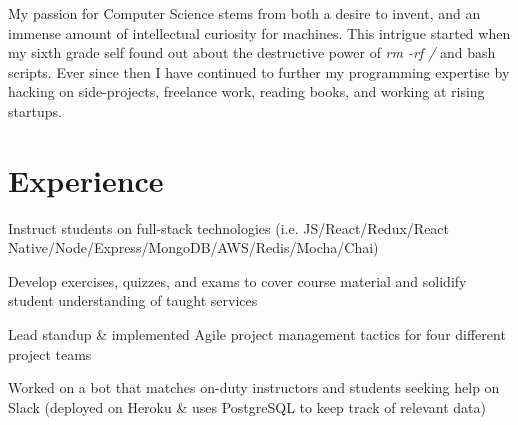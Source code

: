 \documentclass[letterpaper]{deedy-resume} %
\begin{document}
\begin{minipage}[t]{0.66\textwidth} %


  My passion for Computer Science stems from both a desire to invent,
  and an immense amount of intellectual curiosity for machines. This
  intrigue started when my sixth grade self found
  out about the destructive power of {\it rm -rf /} and bash scripts.
  Ever since then I have continued to further my programming
  expertise by hacking on side-projects, freelance work,
  reading books, and working at rising startups.
  


  \section{Experience}



  \begin{tightitemize}
  \item Instruct students on full-stack technologies (i.e. JS/React/Redux/React Native/Node/Express/MongoDB/AWS/Redis/Mocha/Chai)
  \item Develop exercises, quizzes, and exams to cover course material and solidify student understanding of taught services
  \item Lead standup \& implemented Agile project management tactics for four different project teams
  \item Worked on a bot that matches on-duty instructors and students seeking help on Slack (deployed on Heroku \& uses PostgreSQL to keep track of relevant data)
  \end{tightitemize}

  \sectionspace %



\end{minipage}
\end{document}
